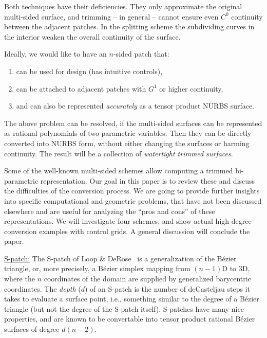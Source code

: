 \documentclass{article}
\begin{document}
Both techniques have their deficiencies. They only approximate the original multi-sided
surface, and trimming -- in general -- cannot ensure even $C^0$ continuity between the
adjacent patches. In the splitting scheme the subdividing curves in the interior
weaken the overall continuity of the surface.

Ideally, we would like to have an $n$-sided patch that:
\begin{enumerate}[label=\roman*),leftmargin=3\parindent]
\item can be used for design (has intuitive controls),
\item can be attached to adjacent patches with $G^1$ or higher continuity,
\item and can also be represented \emph{accurately} as a tensor product NURBS surface.
\end{enumerate}

The above problem can be resolved, if the multi-sided surfaces can be represented as rational
polynomials of two parametric variables. Then they can be directly converted into
NURBS form, without either changing the surfaces or harming continuity. The result will be
a collection of \emph{watertight trimmed surfaces}.
 
Some of the well-known multi-sided schemes allow computing a trimmed bi-parametric
representation. Our goal in this paper is to review these and discuss the difficulties of
the conversion process. We are going to provide further insights into specific
computational and geometric problems, that have not been discussed elsewhere and are
useful for analyzing the ``pros and cons'' of these representations.
We will investigate four schemes, and show actual high-degree conversion examples with
control grids.
A general discussion will conclude the paper.

\vspace{10pt}
\noindent\underline{S-patch:}\vspace{0.2em}\newline
The S-patch of Loop \& DeRose~\cite{spatch1} is a generalization of the B\'ezier triangle, or,
more precisely, a B\'ezier simplex mapping from $(n-1)$D to 3D, where the $n$ coordinates of the
domain are supplied by generalized barycentric coordinates. The \emph{depth} ($d$) of an S-patch
is the number of deCasteljau steps it takes to evaluate a surface point, i.e., something similar
to the degree of a B\'ezier triangle (but not the degree of the S-patch itself).
S-patches have many nice properties, and are known to be convertable into tensor product
rational B\'ezier surfaces of degree $d(n-2)$.
\end{document}
